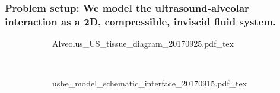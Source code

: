 \begin{frame}
\frametitle{Problem setup: We model the ultrasound-alveolar interaction as a 2D, compressible, inviscid fluid system.}
  \begin{figure}
    \centering
    \begin{subfigure}[b]{0.48\textwidth}
       \centering \def\svgwidth{\textwidth}
      {Alveolus_US_tissue_diagram_20170925.pdf_tex}
      \hfill%
      \label{fig:alveolar_schematic}%
    \end{subfigure}
    ~
    \begin{subfigure}[b]{0.48\textwidth}
      \centering {} \def\svgwidth{\textwidth}
      {usbe_model_schematic_interface_20170915.pdf_tex}
      \hfill%
      \label{fig:problem_schematic}%
    \end{subfigure}
  \end{figure}
\end{frame}


